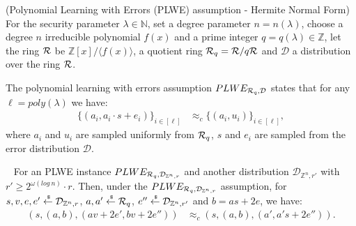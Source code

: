 \begin{definition}{(Polynomial Learning with Errors (PLWE) assumption - Hermite Normal Form)}
  For the security parameter $\lambda \in \mathbb{N}$, set a degree parameter $n = n(\lambda)$, choose a degree $n$ irreducible polynomial $f(x)$ and a prime integer $q = q(\lambda) \in \mathbb{Z}$, let the ring ${\mathcal{R}}$ be $\mathbb{Z}[x]/\langle f(x) \rangle$, a quotient ring  ${\mathcal{R}}_q = {\mathcal{R}}/ q{\mathcal{R}}$ and $\mathcal{D}$ a distribution over the ring ${\mathcal{R}}$.

  The polynomial learning with errors assumption $PLWE_{{\mathcal{R}}_q, \mathcal{D}}$ states that for any $\ell = poly(\lambda)$ we have:
  \begin{align*}
    \{(a_i, a_i \cdot s + e_i)\}_{i \in [\ell]} &\approx_c \{(a_i, u_i)\}_{i \in [\ell]},
  \end{align*}
  where $a_i$ and $u_i$ are sampled uniformly from ${\mathcal{R}}_q$, $s$ and $e_i$ are sampled from the error distribution $\mathcal{D}$.

\end{definition}

\begin{lemma}~\cite{DBLP:conf/crypto/BrakerskiV11}
  For an PLWE instance $PLWE_{{\mathcal{R}}_q, \mathcal{D}_{\mathbb{Z}^n, r}}$ and another distribution $\mathcal{D}_{\mathbb{Z}^n,r'}$ with $r' \geq 2^{\omega(log~n)} \cdot r$.
  Then, under the $PLWE_{{\mathcal{R}}_q, \mathcal{D}_{\mathbb{Z}^n, r}}$ assumption, for $s, v, e, e' \stackrel{{\scriptscriptstyle \mkern4mu \$}}{\gets} \mathcal{D}_{\mathbb{Z}^n,r}$, $a, a' \stackrel{{\scriptscriptstyle \mkern4mu \$}}{\gets} {\mathcal{R}}_q$, $e'' \stackrel{{\scriptscriptstyle \mkern4mu \$}}{\gets} \mathcal{D}_{\mathbb{Z}^n, r'}$ and $b = as + 2e$,
  we have:
  \begin{align*}
    (s, (a, b), (av + 2e', bv + 2e'')) &\approx_c (s, (a,b), (a', a's+2e'')).
  \end{align*}
\end{lemma}
